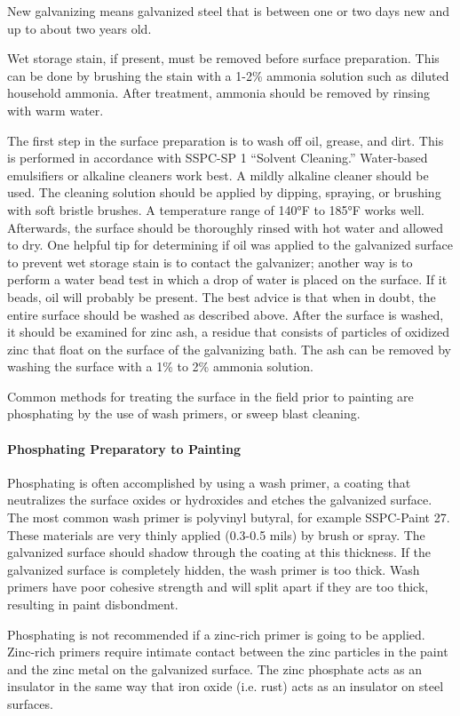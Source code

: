 New galvanizing means galvanized steel that is between one or two days new and up to about two years old.

Wet storage stain, if present, must be removed before surface preparation. This can be done by brushing the stain
with a 1-2\% ammonia solution such as diluted household ammonia. After treatment, ammonia should be removed by
rinsing with warm water.

The first step in the surface preparation is to wash off oil, grease, and dirt. This is performed in accordance with
SSPC-SP 1 “Solvent Cleaning.” Water-based emulsifiers or alkaline cleaners work best. A mildly alkaline cleaner
should be used. The cleaning solution should be applied by dipping, spraying, or brushing with soft bristle brushes. A
temperature range of 140°F to 185°F works well. Afterwards, the surface should be thoroughly rinsed with hot water
and allowed to dry. One helpful tip for determining if oil was applied to the galvanized surface to prevent wet storage
stain is to contact the galvanizer; another way is to perform a water bead test in which a drop of water is placed on
the surface. If it beads, oil will probably be present. The best advice is that when in doubt, the entire surface should
be washed as described above. After the surface is washed, it should be examined for zinc ash, a residue that consists
of particles of oxidized zinc that float on the surface of the galvanizing bath. The ash can be removed by washing the
surface with a 1\% to 2\% ammonia solution.

Common methods for treating the surface in the field prior to painting are phosphating by the use of wash
primers, or sweep blast cleaning.

\paragraph{Phosphating Preparatory to Painting}
Phosphating is often accomplished by using a wash primer, a coating that neutralizes the surface oxides or
hydroxides and etches the galvanized surface. The most common wash primer is polyvinyl butyral, for example
SSPC-Paint 27. These materials are very thinly applied (0.3-0.5 mils) by brush or spray. The galvanized surface
should shadow through the coating at this thickness. If the galvanized surface is completely hidden, the wash primer
is too thick. Wash primers have poor cohesive strength and will split apart if they are too thick, resulting in paint
disbondment.

Phosphating is not recommended if a zinc-rich primer is going to be applied. Zinc-rich primers require intimate
contact between the zinc particles in the paint and the zinc metal on the galvanized surface. The zinc phosphate acts
as an insulator in the same way that iron oxide (i.e. rust) acts as an insulator on steel surfaces.

